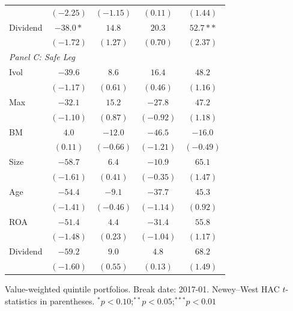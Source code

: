 \begin{tabular}{l c c c c}
 & $(-2.25)$ & $(-1.15)$ & $(0.11)$ & $(1.44)$ \\
Dividend & $-38.0*$ & $14.8$ & $20.3$ & $52.7**$ \\
 & $(-1.72)$ & $(1.27)$ & $(0.70)$ & $(2.37)$ \\
\midrule
\multicolumn{5}{l}{\textit{Panel C: Safe Leg}} \\
Ivol & $-39.6$ & $8.6$ & $16.4$ & $48.2$ \\
 & $(-1.17)$ & $(0.61)$ & $(0.46)$ & $(1.16)$ \\
Max & $-32.1$ & $15.2$ & $-27.8$ & $47.2$ \\
 & $(-1.10)$ & $(0.87)$ & $(-0.92)$ & $(1.18)$ \\
BM & $4.0$ & $-12.0$ & $-46.5$ & $-16.0$ \\
 & $(0.11)$ & $(-0.66)$ & $(-1.21)$ & $(-0.49)$ \\
Size & $-58.7$ & $6.4$ & $-10.9$ & $65.1$ \\
 & $(-1.61)$ & $(0.41)$ & $(-0.35)$ & $(1.47)$ \\
Age & $-54.4$ & $-9.1$ & $-37.7$ & $45.3$ \\
 & $(-1.41)$ & $(-0.46)$ & $(-1.14)$ & $(0.92)$ \\
ROA & $-51.4$ & $4.4$ & $-31.4$ & $55.8$ \\
 & $(-1.48)$ & $(0.23)$ & $(-1.04)$ & $(1.17)$ \\
Dividend & $-59.2$ & $9.0$ & $4.8$ & $68.2$ \\
 & $(-1.60)$ & $(0.55)$ & $(0.13)$ & $(1.49)$ \\
\bottomrule
\end{tabular}
\vspace{4pt}
\begin{minipage}{0.9\textwidth}
\footnotesize
Value-weighted quintile portfolios. Break date: 2017-01.
Newey--West HAC $t$-statistics in parentheses.
$^{*}p<0.10$;\quad $^{**}p<0.05$;\quad $^{***}p<0.01$
\end{minipage}